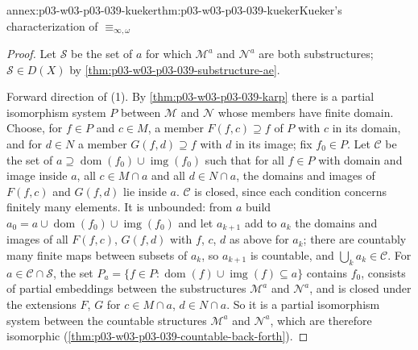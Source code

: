 \begin{annexitem}{annex:p03-w03-p03-039-kueker}{thm:p03-w03-p03-039-kueker}{Kueker's characterization of \(\equiv_{\infty,\omega}\)}
\begin{proof}
Let \(\mathcal S\) be the set of \(a\) for which \(\mathcal M^a\) and
\(\mathcal N^a\) are both substructures; \(\mathcal S\in D(X)\) by
\cref{thm:p03-w03-p03-039-substructure-ae}.

Forward direction of (1). By \cref{thm:p03-w03-p03-039-karp} there is a
partial isomorphism system \(P\) between \(\mathcal M\) and \(\mathcal N\)
whose members have finite domain. Choose, for \(f\in P\) and \(c\in M\), a
member \(F(f,c)\supseteq f\) of \(P\) with \(c\) in its domain, and for
\(d\in N\) a member \(G(f,d)\supseteq f\) with \(d\) in its image; fix
\(f_0\in P\). Let \(\mathcal C\) be the set of
\(a\supseteq\operatorname{dom}(f_0)\cup\operatorname{img}(f_0)\) such that
for all \(f\in P\) with domain and image inside \(a\), all \(c\in M\cap a\)
and all \(d\in N\cap a\), the domains and images of \(F(f,c)\) and
\(G(f,d)\) lie inside \(a\). \(\mathcal C\) is closed, since each condition
concerns finitely many elements. It is unbounded: from \(a\) build
\(a_0=a\cup\operatorname{dom}(f_0)\cup\operatorname{img}(f_0)\) and let
\(a_{k+1}\) add to \(a_k\) the domains and images of all \(F(f,c)\),
\(G(f,d)\) with \(f\), \(c\), \(d\) as above for \(a_k\); there are
countably many finite maps between subsets of \(a_k\), so \(a_{k+1}\) is
countable, and \(\bigcup_ka_k\in\mathcal C\). For
\(a\in\mathcal C\cap\mathcal S\), the set
\(P_a=\{f\in P:\operatorname{dom}(f)\cup\operatorname{img}(f)\subseteq a\}\)
contains \(f_0\), consists of partial embeddings between the substructures
\(\mathcal M^a\) and \(\mathcal N^a\), and is closed under the extensions
\(F\), \(G\) for \(c\in M\cap a\), \(d\in N\cap a\). So it is a partial
isomorphism system between the countable structures \(\mathcal M^a\) and
\(\mathcal N^a\), which are therefore isomorphic
(\cref{thm:p03-w03-p03-039-countable-back-forth}).


\end{proof}
\end{annexitem}
